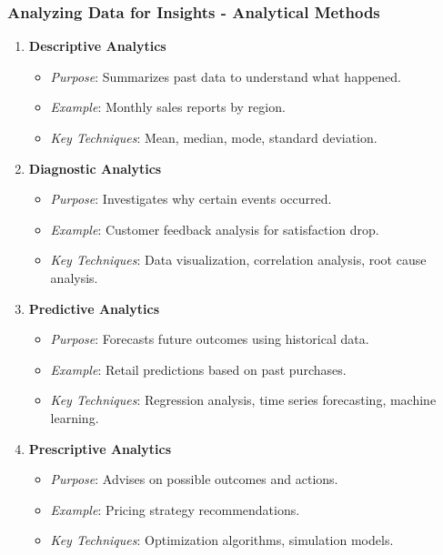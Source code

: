 \documentclass[aspectratio=169]{beamer}
\begin{document}
\begin{frame}[fragile]
    \frametitle{Analyzing Data for Insights - Analytical Methods}
    \begin{enumerate}
        \item \textbf{Descriptive Analytics}
            \begin{itemize}
                \item \textit{Purpose}: Summarizes past data to understand what happened.
                \item \textit{Example}: Monthly sales reports by region.
                \item \textit{Key Techniques}: Mean, median, mode, standard deviation.
            \end{itemize}
        \item \textbf{Diagnostic Analytics}
            \begin{itemize}
                \item \textit{Purpose}: Investigates why certain events occurred.
                \item \textit{Example}: Customer feedback analysis for satisfaction drop.
                \item \textit{Key Techniques}: Data visualization, correlation analysis, root cause analysis.
            \end{itemize}
        \item \textbf{Predictive Analytics}
            \begin{itemize}
                \item \textit{Purpose}: Forecasts future outcomes using historical data.
                \item \textit{Example}: Retail predictions based on past purchases.
                \item \textit{Key Techniques}: Regression analysis, time series forecasting, machine learning.
            \end{itemize}
        \item \textbf{Prescriptive Analytics}
            \begin{itemize}
                \item \textit{Purpose}: Advises on possible outcomes and actions.
                \item \textit{Example}: Pricing strategy recommendations.
                \item \textit{Key Techniques}: Optimization algorithms, simulation models.
            \end{itemize}
    \end{enumerate}
\end{frame}
\end{document}
